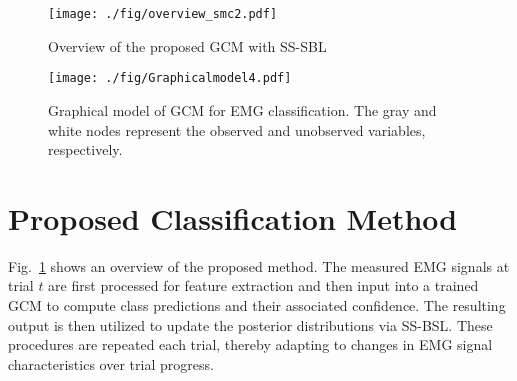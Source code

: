 \documentclass[letterpaper, 10 pt, conference]{ieeeconf}
\begin{document}
\begin{figure}[t]
  \centering
    \texttt{[image: ./fig/overview\_smc2.pdf]}
  \caption{Overview of the proposed GCM with SS-SBL}
   \label{fig :overview}
\end{figure}

\begin{figure}[t]
    \centering
      \texttt{[image: ./fig/Graphicalmodel4.pdf]}
    \caption{Graphical model of GCM for EMG classification. The gray and white nodes represent the observed and unobserved variables, respectively.}
     \label{fig :Graphicalmodel}
\end{figure}

\section{Proposed Classification Method}
Fig.~\ref{fig :overview} shows an overview of the proposed method.
The measured EMG signals at trial $t$ are first processed for feature extraction and then input into a trained GCM to compute class predictions and their associated confidence. 
The resulting output is then utilized to update the posterior distributions via SS-BSL. 
These procedures are repeated each trial, thereby adapting to changes in EMG signal characteristics over trial progress.
\end{document}
